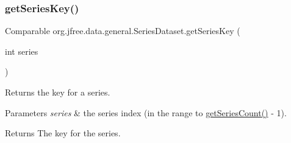 \subsubsection{\texorpdfstring{get\+Series\+Key()}{getSeriesKey()}}
{\footnotesize\ttfamily Comparable org.\+jfree.\+data.\+general.\+Series\+Dataset.\+get\+Series\+Key (\begin{DoxyParamCaption}\item[{int}]{series }\end{DoxyParamCaption})}

Returns the key for a series.


\begin{DoxyParams}{Parameters}
{\em series} & the series index (in the range {} to {\ttfamily \mbox{\hyperlink{interfaceorg_1_1jfree_1_1data_1_1general_1_1_series_dataset_a84fe822f5918f941d9de1ed1b73c9f58}{get\+Series\+Count()}} -\/ 1}).\\
\hline
\end{DoxyParams}
\begin{DoxyReturn}{Returns}
The key for the series. 
\end{DoxyReturn}


